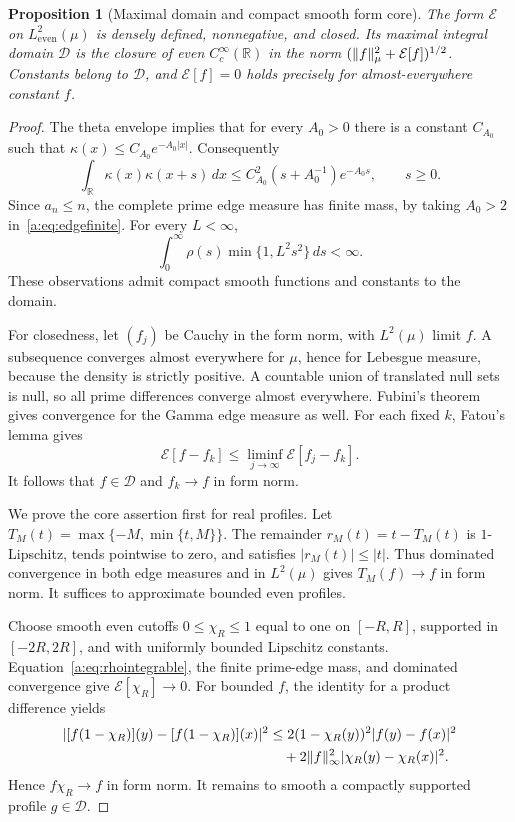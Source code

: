 \documentclass[11pt,a4paper]{article}
\numberwithin{equation}{section}
\newtheorem{proposition}[theorem]{Proposition}
\theoremstyle{definition}\newtheorem{definition}[theorem]{Definition}
\theoremstyle{remark}\newtheorem{remark}[theorem]{Remark}
\newcommand{\R}{\mathbb R}\newcommand{\C}{\mathbb C}\newcommand{\N}{\mathbb N}
\newcommand{\E}{\mathcal E}\newcommand{\D}{\mathcal D}
\newcommand{\He}{L^2_{\mathrm{even}}(\mu)}\newcommand{\Le}{L^2_{\mathrm{even}}(dx)}
\begin{document}
\begin{proposition}[Maximal domain and compact smooth form core]\label{a:prop:core}
The form $\E$ on $\He$ is densely defined, nonnegative, and closed. Its maximal integral domain $\D$ is the closure of even $C_c^\infty(\R)$ in the norm $(\norm{f}_\mu^2+\E[f])^{1/2}$. Constants belong to $\D$, and $\E[f]=0$ holds precisely for almost-everywhere constant $f$.
\end{proposition}
\begin{proof}
The theta envelope implies that for every $A_0>0$ there is a constant $C_{A_0}$ such that $\kappa(x)\le C_{A_0}e^{-A_0|x|}$. Consequently
\begin{equation}\label{a:eq:edgefinite}
 \int_\R\kappa(x)\kappa(x+s)\,dx
 \le C_{A_0}^2(s+A_0^{-1})e^{-A_0s},\qquad s\ge0.
\end{equation}
Since $a_n\le n$, the complete prime edge measure has finite mass, by taking $A_0>2$ in~\eqref{a:eq:edgefinite}. For every $L<\infty$,
\begin{equation}\label{a:eq:rhointegrable}
 \int_0^\infty\rho(s)\min\{1,L^2s^2\}\,ds<\infty.
\end{equation}
These observations admit compact smooth functions and constants to the domain.

For closedness, let $(f_j)$ be Cauchy in the form norm, with $L^2(\mu)$ limit $f$. A subsequence converges almost everywhere for $\mu$, hence for Lebesgue measure, because the density is strictly positive. A countable union of translated null sets is null, so all prime differences converge almost everywhere. Fubini's theorem gives convergence for the Gamma edge measure as well. For each fixed $k$, Fatou's lemma gives
\[
 \E[f-f_k]\le\liminf_{j\to\infty}\E[f_j-f_k].
\]
It follows that $f\in\D$ and $f_k\to f$ in form norm.

We prove the core assertion first for real profiles. Let $T_M(t)=\max\{-M,\min\{t,M\}\}$. The remainder $r_M(t)=t-T_M(t)$ is $1$-Lipschitz, tends pointwise to zero, and satisfies $|r_M(t)|\le|t|$. Thus dominated convergence in both edge measures and in $L^2(\mu)$ gives $T_M(f)\to f$ in form norm. It suffices to approximate bounded even profiles.

Choose smooth even cutoffs $0\le\chi_R\le1$ equal to one on $[-R,R]$, supported in $[-2R,2R]$, and with uniformly bounded Lipschitz constants. Equation~\eqref{a:eq:rhointegrable}, the finite prime-edge mass, and dominated convergence give $\E[\chi_R]\to0$. For bounded $f$, the identity for a product difference yields
\begin{align*}
 |[f(1-\chi_R)](y)-[f(1-\chi_R)](x)|^2
 &\le2(1-\chi_R(y))^2|f(y)-f(x)|^2\\
 &\quad+2\lVert f\rVert_\infty^2|\chi_R(y)-\chi_R(x)|^2.
\end{align*}
Hence $f\chi_R\to f$ in form norm. It remains to smooth a compactly supported profile $g\in\D$.


\end{proof}
\end{document}
